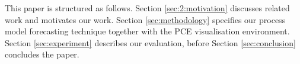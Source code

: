 
This paper is structured as follows. Section \ref{sec:2:motivation} discusses related work and motivates our work. Section \ref{sec:methodology} specifies our process model forecasting technique together with the PCE visualisation environment. Section \ref{sec:experiment} describes our evaluation, before Section \ref{sec:conclusion} concludes the paper.